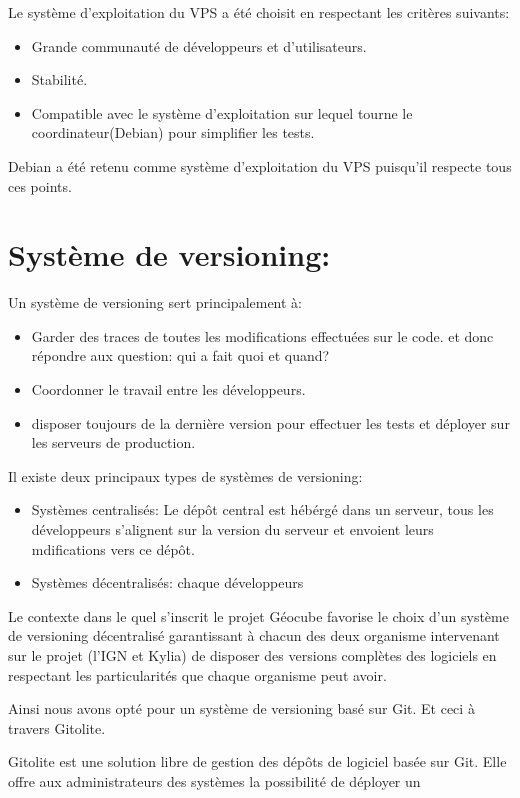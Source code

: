 \documentclass{themeensg}
\begin{document}
Le système d'exploitation du VPS a été choisit en respectant les critères suivants:
\begin{itemize}
\item Grande communauté de développeurs et d'utilisateurs.
\item Stabilité.
\item Compatible avec le système d'exploitation sur lequel tourne le coordinateur(Debian) pour simplifier les tests.
\end{itemize}

Debian a été retenu comme système d'exploitation du VPS puisqu'il respecte tous ces points.

\section{Système de versioning:}
Un système de versioning sert principalement à:

\begin{itemize}
\item Garder des traces de toutes les modifications effectuées sur le code. et donc répondre aux question: qui a fait quoi et quand?
\item Coordonner le travail entre les développeurs.
\item disposer toujours de la dernière version pour effectuer les tests et déployer sur les serveurs de production.
\end{itemize}

Il existe deux principaux types de systèmes de versioning:
\begin{itemize}
\item Systèmes centralisés: Le dépôt central est hébérgé dans un serveur, tous les développeurs s'alignent sur la version du serveur et envoient leurs mdifications vers ce dépôt.
\item Systèmes décentralisés: chaque développeurs
\end{itemize}

Le contexte dans le quel s'inscrit le projet Géocube favorise le choix d'un système de versioning décentralisé garantissant à chacun des deux organisme intervenant sur le projet (l'IGN et Kylia) de disposer des versions complètes des logiciels en respectant les particularités que chaque organisme peut avoir.

Ainsi nous avons opté pour un système de versioning basé sur Git. Et ceci à travers Gitolite.

Gitolite est une solution libre de gestion des dépôts de logiciel basée sur Git. Elle offre aux administrateurs des systèmes la possibilité de déployer un 
\end{document}
